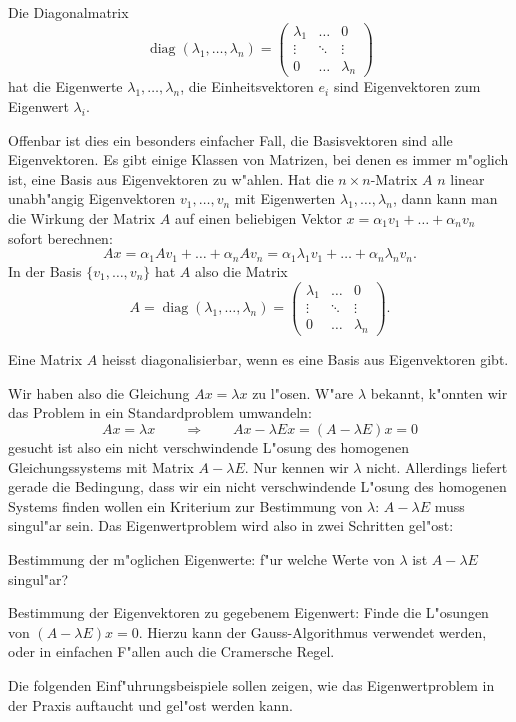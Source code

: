 \begin{hilfssatz}
Die Diagonalmatrix
$$
\operatorname{diag}(\lambda_1,\dots,\lambda_n)
=\begin{pmatrix}
\lambda_1&\dots&0\\
\vdots&\ddots&\vdots\\
0&\dots&\lambda_n
\end{pmatrix}
$$
hat die Eigenwerte $\lambda_1,\dots,\lambda_n$, die Einheitsvektoren
$e_i$ sind Eigenvektoren zum Eigenwert $\lambda_i$.
\end{hilfssatz}
Offenbar ist dies ein besonders einfacher Fall, die Basisvektoren sind
alle Eigenvektoren. Es gibt einige Klassen von Matrizen, bei denen es
immer m"oglich ist, eine Basis aus Eigenvektoren zu w"ahlen. Hat die
$n\times n$-Matrix $A$ $n$ linear unabh"angig Eigenvektoren $v_1,\dots,v_n$
mit Eigenwerten $\lambda_1,\dots,\lambda_n$, dann kann man die Wirkung
der Matrix $A$ auf einen beliebigen Vektor $x=\alpha_1v_1+\dots+\alpha_nv_n$
sofort berechnen:
$$Ax=\alpha_1Av_1+\dots+\alpha_nAv_n=\alpha_1\lambda_1v_1+\dots+\alpha_n\lambda_nv_n.$$
In der Basis $\{v_1,\dots,v_n\}$ hat $A$ also die Matrix
$$
A=\operatorname{diag}(\lambda_1,\dots,\lambda_n)
=
\begin{pmatrix}
\lambda_1&\dots&0\\
\vdots&\ddots&\vdots\\
0&\dots&\lambda_n
\end{pmatrix}.
$$
\begin{definition}
Eine Matrix $A$ heisst diagonalisierbar, wenn es eine Basis aus
Eigenvektoren gibt.
\end{definition}

Wir haben also die Gleichung $Ax=\lambda x$ zu l"osen. W"are 
$\lambda$ bekannt, k"onnten wir das Problem in ein Standardproblem
umwandeln:
\[
Ax=\lambda x\qquad\Rightarrow\qquad Ax-\lambda Ex=(A-\lambda E)x=0
\]
gesucht ist also ein nicht verschwindende L"osung des homogenen
Gleichungssystems mit
Matrix $A-\lambda E$. Nur kennen wir $\lambda$ nicht. Allerdings
liefert gerade die Bedingung, dass wir ein nicht verschwindende
L"osung des homogenen Systems finden wollen ein Kriterium zur
Bestimmung von $\lambda$: $A-\lambda E$ muss singul"ar sein.
Das Eigenwertproblem wird also in zwei Schritten gel"ost:
\begin{compactenum}
\item Bestimmung der m"oglichen Eigenwerte: f"ur welche Werte von $\lambda$
ist $A-\lambda E$ singul"ar?
\item Bestimmung der Eigenvektoren zu gegebenem Eigenwert: Finde die
L"osungen von $(A-\lambda E)x=0$. Hierzu kann der Gauss-Algorithmus
verwendet werden, oder in einfachen F"allen auch die Cramersche Regel.
\end{compactenum}
Die folgenden Einf"uhrungsbeispiele sollen zeigen, wie das Eigenwertproblem
in der Praxis auftaucht und gel"ost werden kann. 

